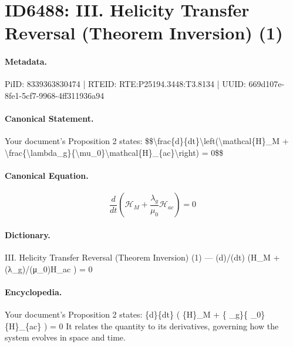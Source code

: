 \section*{ID6488: III. Helicity Transfer Reversal (Theorem Inversion) (1)}
\paragraph{Metadata.}
PiID: 8339363830474 | RTEID: RTE:P25194.3448:T3.8134 | UUID: 669d107e-8fe1-5cf7-9968-4ff311936a94

\paragraph{Canonical Statement.}
Your document's Proposition 2 states: \$\$\textbackslash{}frac\{d\}\{dt\}\textbackslash{}left(\textbackslash{}mathcal\{H\}\_M + \textbackslash{}frac\{\textbackslash{}lambda\_g\}\{\textbackslash{}mu\_0\}\textbackslash{}mathcal\{H\}\_\{ac\}\textbackslash{}right) = 0\$\$

\paragraph{Canonical Equation.}
\[
\frac{d}{dt}\left(\mathcal{H}_M + \frac{\lambda_g}{\mu_0}\mathcal{H}_{ac}\right) = 0
\]

\paragraph{Dictionary.}
III. Helicity Transfer Reversal (Theorem Inversion) (1) — (d)/(dt) (H\_M + (λ\_g)/(μ\_0)H\_ac ) = 0

\paragraph{Encyclopedia.}
Your document's Proposition 2 states: \{d\}\{dt\} ( \{H\}\_M + \{ \_g\}\{ \_0\} \{H\}\_\{ac\} ) = 0 It relates the quantity to its derivatives, governing how the system evolves in space and time.
